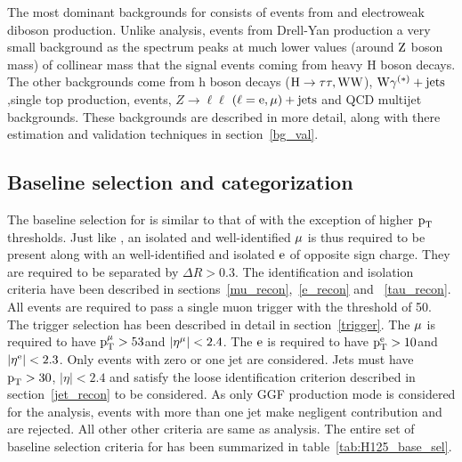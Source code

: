 The most dominant backgrounds for \Hmue consists of events from  \ttb and electroweak diboson production. Unlike \hmue analysis, \ztt events from Drell-Yan production a very small background as the \ztt spectrum peaks at much lower values (around $\text{Z}$ boson mass) of collinear mass that the signal events coming from heavy H boson decays. The other backgrounds come from h boson decays ($\text{H} \to \tau\tau,\text{W}\text{W}$), $\text{W}\gamma^{(*)}+\text{jets}$ ,single top production, \wjets events, $Z\to\ell\ell$ $(\ell = \text{e}, \mu)+\text{jets}$ and QCD multijet backgrounds. These backgrounds are described in more detail, along with there estimation and validation techniques in section~\ref{bg_val}.        

\subsection{Baseline selection and categorization}
\label{H_presel_cat}
The baseline selection for \Hmue is similar to that of \hmue with the exception of higher $\text{p}_\text{T}$ thresholds. Just like \hmue, an isolated and well-identified $\mu$ is thus required to be present along with an well-identified and isolated $\text{e}$ of opposite sign charge. They are required to be separated by $\Delta R > 0.3$. The identification and isolation criteria have been described in sections~\ref{mu_recon},~\ref{e_recon} and ~\ref{tau_recon}. All events are required to pass a single muon trigger with the threshold of 50\GeV. The trigger selection has been described in detail in section~\ref{trigger}. The $\mu$ is required to have $\text{p}_\text{T}^{\mu} > 53$\GeV and $|\eta^{\mu}|<2.4$. The $\text{e}$ is required to have $\text{p}_\text{T}^{\text{e}} > 10$\GeV and $|\eta^{\text{e}}|<2.3$. Only events with zero or one jet are considered. Jets  must have $\text{p}_\text{T}>30$\GeV, $|\eta| < 2.4 $ and satisfy the loose identification criterion described in section~\ref{jet_recon} to be considered. As only GGF production mode is considered for the \Hmue analysis, events with more than one jet make negligent contribution and are rejected. All other other criteria are same as \hmue analysis. The entire set of baseline selection criteria for \Hmue has been summarized in table~\ref{tab:H125_base_sel}.

